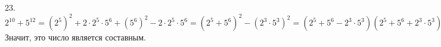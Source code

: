 23. $2^{10}+5^{12}=(2^5)^2+2\cdot2^5\cdot5^6+(5^6)^2-2\cdot2^5\cdot5^6=(2^5+5^6)^2-(2^3\cdot5^3)^2=
(2^5+5^6-2^3\cdot5^3)(2^5+5^6+2^3\cdot5^3).$ Значит, это число является составным.\\
